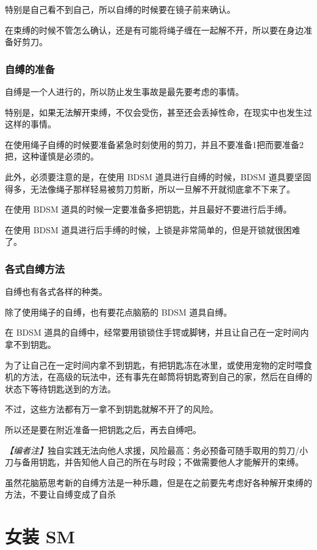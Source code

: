 \documentclass[12pt,UTF8]{ctexbook}
\begin{document}
特别是自己看不到自己，所以自缚的时候要在镜子前来确认。

在束缚的时候不管怎么确认，还是有可能将绳子缠在一起解不开，所以要在身边准备好剪刀。

\subsubsection{自缚的准备}

自缚是一个人进行的，所以防止发生事故是最先要考虑的事情。

特别是，如果无法解开束缚，不仅会受伤，甚至还会丢掉性命，在现实中也发生过这样的事情。

在使用绳子自缚的时候要准备紧急时刻使用的剪刀，并且不要准备1把而要准备2把，这种谨慎是必须的。

此外，必须要注意的是，在使用 BDSM 道具进行自缚的时候，BDSM 道具要坚固得多，无法像绳子那样轻易被剪刀剪断，所以一旦解不开就彻底拿不下来了。

在使用 BDSM 道具的时候一定要准备多把钥匙，并且最好不要进行后手缚。

在使用 BDSM 道具进行后手缚的时候，上锁是非常简单的，但是开锁就很困难了。

\subsubsection{各式自缚方法}

自缚也有各式各样的种类。

除了使用绳子的自缚，也有要花点脑筋的 BDSM 道具自缚。

在 BDSM 道具的自缚中，经常要用锁锁住手锷或脚铐，并且让自己在一定时间内拿不到钥匙。

为了让自己在一定时间内拿不到钥匙，有把钥匙冻在冰里，或使用宠物的定时喂食机的方法，在高级的玩法中，还有事先在邮筒将钥匙寄到自己的家，然后在自缚的状态下等待钥匙送到的方法。

不过，这些方法都有万一拿不到钥匙就解不开了的风险。

所以还是要在附近准备一把钥匙之后，再去自缚吧。

\noindent\textit{【编者注】}独自实践无法向他人求援，风险最高：务必预备可随手取用的剪刀/小刀与备用钥匙，并告知他人自己的所在与时段；不做需要他人才能解开的束缚。

虽然花脑筋思考新的自缚方法是一种乐趣，但是在之前要先考虑好各种解开束缚的方法，不要让自缚变成了自杀

\section{女装 SM}
\end{document}
